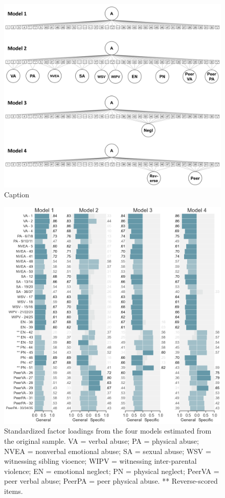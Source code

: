 \documentclass[letterpaper,man,natbib]{apa6}  %
\begin{document}
\begin{figure}
    \centering
    \includegraphics[width=1.1\textwidth,center]{figures/fig00.png}
    \caption{Caption}
    \label{fig:models}
\end{figure}

\begin{figure}
    \centering
    \includegraphics[width=1.1\textwidth,center]{figures/fig01.png}
    \caption{Standardized factor loadings from the four models estimated from the original sample. VA = verbal abuse; PA = physical abuse; NVEA = nonverbal emotional abuse; SA = sexual abuse; WSV = witnessing sibling vioence; WIPV = witnessing inter-parental violence; EN = emotional neglect; PN = physical neglect; PeerVA = peer verbal abuse; PeerPA = peer physical abuse. ** Reverse-scored items.}
    \label{fig:loadings_original}
\end{figure}
\end{document}
